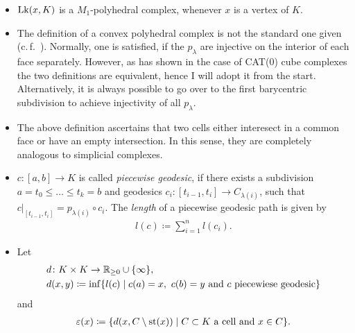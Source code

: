 \begin{rem}
  \begin{itemize}
  \item \(\operatorname{Lk}(x, K)\) is a \(M_1\)-polyhedral complex, whenever \(x\) is a vertex of \(K\).
  \item The definition of a convex polyhedral complex is not the standard one given (c.\,f.~\cite[Def.~I.7.37]{MR1744486}). Normally, one is satisfied, if the \(p_\lambda\) are injective on the interior of each face separately. However, as \textcite[Thm.~C.4]{MR3029427} has shown in the case of CAT(0) cube complexes the two definitions are equivalent, hence I will adopt it from the start. Alternatively, it is always possible to go over to the first barycentric subdivision to achieve injectivity of all \(p_\lambda\).
  \item The above definition ascertains that two cells either interesect in a common face or have an empty intersection. In this sense, they are completely analogous to simplicial complexes. 
  \end{itemize}
\end{rem}

\begin{bsp}
\end{bsp}

\begin{defin}
  \label{def:epsilon}
  \begin{itemize}
  \item \(c\colon [a, b] \to K\) is called \emph{piecewise geodesic}, if there exists a subdivision \(a = t_0 \leq \dots \leq t_k = b\) and geodesics \(c_i\colon [t_{i-1}, t_i] \to C_{\lambda(i)}\), such that \(c|_{[t_{i-1}, t_i]} = p_{\lambda(i)} \circ c_i\). The \emph{length} of a piecewise geodesic path is given by
    \begin{align*}
      l(c) \coloneqq \sum_{i=1}^n l(c_i).
    \end{align*}
  \item Let
    \begin{align*}
      &d\colon K \times K \to \mathbb{R}_{\geq 0} \cup \{\infty\},\\
      &d(x,y) \coloneqq \inf\{l(c) \mid c(a) = x,\ c(b) = y \text{ and } c \text{ piecewiese geodesic}\}
    \end{align*}
    and
    \begin{align}
      \varepsilon(x) \coloneqq \{d(x, C \setminus \operatorname{st}(x)) \mid C \subset K \text{ a cell and } x \in C\}. \label{eq:epsilon}
    \end{align}
  \end{itemize}
\end{defin}



